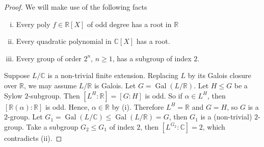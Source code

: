 \documentclass{article}
\theoremstyle{definition}
\theoremstyle{remark}
\theoremstyle{plain}
\newcommand{\RR}{\mathbb{R}}
\newcommand{\CC}{\mathbb{C}}
\newcommand{\Gal}{\operatorname{Gal}}
\begin{document}
\begin{proof}
    We will make use of the following facts
    \begin{enumerate}[(i)]
        \item Every poly $f\in \RR[X]$ of odd degree has a root in $\RR$
        \item Every quadratic polynomial in $\CC[X]$ has a root.
        \item Every group of order $2^n$, $n\ge 1$, has a subgroup of index $2$.
    \end{enumerate}

    Suppose $L/\CC$ is a non-trivial finite extension. Replacing $L$ by its Galois closure over $\RR$, we may assume $L/\RR$ is Galois. Let $G=\Gal(L/\RR)$. Let $H\le G$ be a Sylow $2$-subgroup. Then $[L^H:\RR]=[G:H]$ is odd. So if $\alpha\in L^H$, then $[\RR(\alpha):\RR]$ is odd. Hence, $\alpha\in \RR$ by (i). Therefore $L^H=\RR$ and $G=H$, so $G$ is a $2$-group. Let $G_1=\Gal(L/\CC)\le \Gal(L/\RR)=G$, then $G_1$ is a (non-trivial) $2$-group. Take a subgroup $G_2\le G_1$ of index $2$, then $[L^{G_2}:\CC]=2$, which contradicts (ii).
\end{proof}
\end{document}
